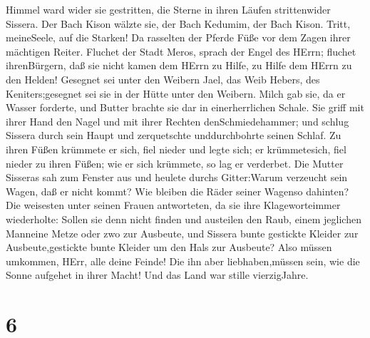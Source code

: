 Himmel ward wider sie gestritten, die Sterne in ihren Läufen
strittenwider Sissera.  Der Bach Kison wälzte sie, der Bach
Kedumim, der Bach Kison. Tritt, meineSeele, auf die Starken!
 Da rasselten der Pferde Füße vor dem Zagen ihrer mächtigen
Reiter.  Fluchet der Stadt Meros, sprach der Engel des
HErrn; fluchet ihrenBürgern, daß sie nicht kamen dem HErrn zu Hilfe, zu
Hilfe dem HErrn zu den Helden!  Gesegnet sei unter den
Weibern Jael, das Weib Hebers, des Keniters;gesegnet sei sie in der
Hütte unter den Weibern.  Milch gab sie, da er Wasser
forderte, und Butter brachte sie dar in einerherrlichen Schale.
 Sie griff mit ihrer Hand den Nagel und mit ihrer Rechten
denSchmiedehammer; und schlug Sissera durch sein Haupt und zerquetschte
unddurchbohrte seinen Schlaf.  Zu ihren Füßen krümmete er
sich, fiel nieder und legte sich; er krümmetesich, fiel nieder zu ihren
Füßen; wie er sich krümmete, so lag er verderbet.  Die
Mutter Sisseras sah zum Fenster aus und heulete durchs Gitter:Warum
verzeucht sein Wagen, daß er nicht kommt? Wie bleiben die Räder seiner
Wagenso dahinten?  Die weisesten unter seinen Frauen
antworteten, da sie ihre Klageworteimmer wiederholte: 
Sollen sie denn nicht finden und austeilen den Raub, einem jeglichen
Manneine Metze oder zwo zur Ausbeute, und Sissera bunte gestickte
Kleider zur Ausbeute,gestickte bunte Kleider um den Hals zur Ausbeute?
 Also müssen umkommen, HErr, alle deine Feinde! Die ihn
aber liebhaben,müssen sein, wie die Sonne aufgehet in ihrer Macht! Und
das Land war stille vierzigJahre.

\hypertarget{section-5}{%
\section{6}\label{section-5}}

